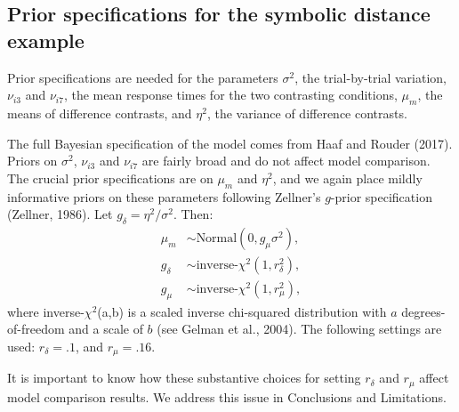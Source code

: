 \documentclass[english,,man]{apa6}
\begin{document}
\hypertarget{prior-specifications-for-the-symbolic-distance-example}{%
\subsection{Prior specifications for the symbolic distance example}\label{prior-specifications-for-the-symbolic-distance-example}}

Prior specifications are needed for the parameters \(\sigma^2\), the trial-by-trial variation, \(\nu_{i3}\) and \(\nu_{i7}\), the mean response times for the two contrasting conditions, \(\mu_m\), the means of difference contrasts, and \(\eta^2\), the variance of difference contrasts.

The full Bayesian specification of the model comes from Haaf and Rouder (2017). Priors on \(\sigma^2\), \(\nu_{i3}\) and \(\nu_{i7}\) are fairly broad and do not affect model comparison. The crucial prior specifications are on \(\mu_m\) and \(\eta^2\), and we again place mildly informative priors on these parameters following Zellner's \(g\)-prior specification (Zellner, 1986). Let \(g_\delta=\eta^2/\sigma^2\). Then:
\[
\begin{aligned}
\mu_m & \sim \mbox{Normal}(0,g_{\mu}\sigma^2),\\
g_\delta & \sim \mbox{inverse-$\chi^2$}(1,r^2_\delta),\\
g_\mu & \sim \mbox{inverse-$\chi^2$}(1,r^2_\mu),
\end{aligned}
\]
where inverse-\(\chi^2\)(a,b) is a scaled inverse chi-squared distribution with \(a\) degrees-of-freedom and a scale of \(b\) (see Gelman et al., 2004). The following settings are used: \(r_\delta= .1\), and \(r_{\mu}=.16\).

It is important to know how these substantive choices for setting \(r_\delta\) and \(r_{\mu}\) affect model comparison results. We address this issue in Conclusions and Limitations.
\end{document}
